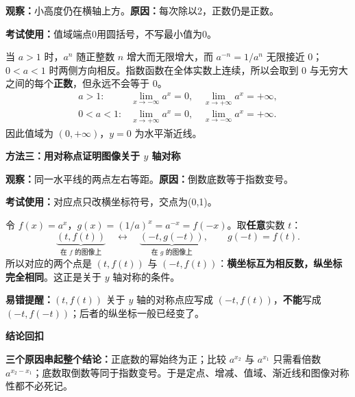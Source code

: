 \clearpage
\begin{proofbox}


\textbf{观察：}小高度仍在横轴上方。\quad\textbf{原因：}每次除以2，正数仍是正数。

\textbf{考试使用：}值域端点0用圆括号，不写最小值为0。

\begin{description}[style=nextline,leftmargin=2.8em,labelsep=0.5em,itemsep=0.55em]
  \item[\textbf{第五步（为什么值域是所有正数）：}]
  当 $a>1$ 时，$a^n$ 随正整数 $n$ 增大而无限增大，而 $a^{-n}=1/a^n$ 无限接近 $0$；$0<a<1$ 时两侧方向相反。指数函数在全体实数上连续，所以会取到 $0$ 与无穷大之间的每个\textbf{正数}，但永远不会等于 $0$。
  \[
  \begin{array}{ll}
    a>1: &\displaystyle\lim_{x\to-\infty}a^x=0,\quad \lim_{x\to+\infty}a^x=+\infty,\\[0.4em]
    0<a<1: &\displaystyle\lim_{x\to+\infty}a^x=0,\quad \lim_{x\to-\infty}a^x=+\infty.
  \end{array}
  \]
  因此值域为 $(0,+\infty)$，$y=0$ 为水平渐近线。
\end{description}

\medskip

\end{proofbox}
\clearpage
\begin{proofbox}
\textbf{\textcolor{CProof}{方法三：用对称点证明图像关于 $y$ 轴对称}}

\textbf{观察：}同一水平线的两点左右等距。\quad\textbf{原因：}倒数底数等于指数变号。

\textbf{考试使用：}对应点只改横坐标符号，交点为(0,1)。



令 $f(x)=a^x$，$g(x)=(1/a)^x=a^{-x}=f(-x)$。取\textbf{任意}实数 $t$：
\[
  \underbrace{(t,f(t))}_{\text{在 }f\text{ 的图像上}}
  \quad\longleftrightarrow\quad
  \underbrace{(-t,g(-t))}_{\text{在 }g\text{ 的图像上}},
  \qquad g(-t)=f(t).
\]
所以对应的两个点是 $(t,f(t))$ 与 $(-t,f(t))$：\textbf{横坐标互为相反数，纵坐标完全相同}。这正是关于 $y$ 轴对称的条件。

\textbf{易错提醒：}$(t,f(t))$ 关于 $y$ 轴的对称点应写成 $(-t,f(t))$，\textbf{不能}写成 $(-t,f(-t))$；后者的纵坐标一般已经变了。

\medskip
\textbf{\textcolor{CProof}{结论回扣}}

\textbf{三个原因串起整个结论：}正底数的幂始终为正；比较 $a^{x_2}$ 与 $a^{x_1}$ 只需看倍数 $a^{x_2-x_1}$；底数取倒数等同于指数变号。于是定点、增减、值域、渐近线和图像对称性都不必死记。

\end{proofbox}
